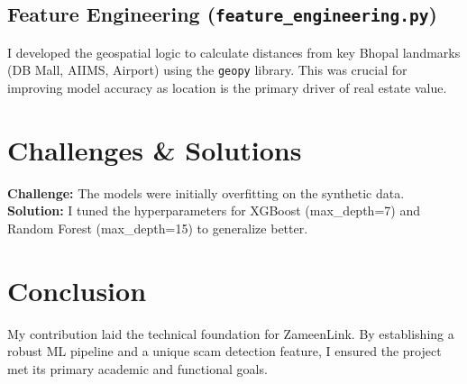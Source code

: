 \documentclass[12pt, a4paper]{article}
\begin{document}
\subsection{Feature Engineering (\texttt{feature\_engineering.py})}
I developed the geospatial logic to calculate distances from key Bhopal landmarks (DB Mall, AIIMS, Airport) using the \texttt{geopy} library. This was crucial for improving model accuracy as location is the primary driver of real estate value.

\section{Challenges \& Solutions}
\textbf{Challenge:} The models were initially overfitting on the synthetic data.\\
\textbf{Solution:} I tuned the hyperparameters for XGBoost (max\_depth=7) and Random Forest (max\_depth=15) to generalize better.

\section{Conclusion}
My contribution laid the technical foundation for ZameenLink. By establishing a robust ML pipeline and a unique scam detection feature, I ensured the project met its primary academic and functional goals.
\end{document}
